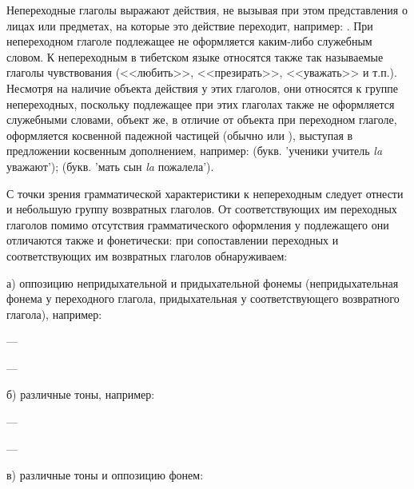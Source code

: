 Непереходные глаголы выражают действия, не вызывая при этом представления о лицах или предметах, на которые это действие переходит, например: . При непереходном глаголе подлежащее не оформляется каким-либо служебным словом. К непереходным в тибетском языке относятся также так называемые глаголы чувствования (<<любить>>, <<презирать>>, <<уважать>> и т.п.). Несмотря на наличие объекта действия у этих глаголов, они относятся к группе непереходных, поскольку подлежащее при этих глаголах также не оформляется служебными словами, объект же, в отличие от объекта при переходном глаголе, оформляется косвенной падежной частицей (обычно  или ), выступая в предложении косвенным дополнением, например:
 (букв. 'ученики учитель \emph{la} уважают');
 (букв. 'мать сын \emph{la} пожалела').

С точки зрения грамматической характеристики к непереходным следует отнести и небольшую группу возвратных глаголов. От соответствующих им переходных глаголов помимо отсутствия грамматического оформления у подлежащего они отличаются также и фонетически: при сопоставлении переходных и соответствующих им возвратных глаголов обнаруживаем:

а) оппозицию непридыхательной и придыхательной фонемы (непридыхательная фонема у переходного глагола, придыхательная у соответствующего возвратного глагола), например:

\begin{description}
	\item{} --- 
	\item{} --- 
\end{description}

б) различные тоны, например:

\begin{description}
	\item{} --- 
	\item{} --- 
\end{description}

в) различные тоны и оппозицию фонем:

